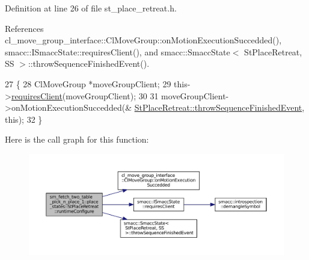 Definition at line 26 of file st\+\_\+place\+\_\+retreat.\+h.



References cl\+\_\+move\+\_\+group\+\_\+interface\+::\+Cl\+Move\+Group\+::on\+Motion\+Execution\+Succedded(), smacc\+::\+I\+Smacc\+State\+::requires\+Client(), and smacc\+::\+Smacc\+State$<$ St\+Place\+Retreat, S\+S $>$\+::throw\+Sequence\+Finished\+Event().


\begin{DoxyCode}
27     \{
28         ClMoveGroup *moveGroupClient;
29         this->\hyperlink{classsmacc_1_1ISmaccState_a7f95c9f0a6ea2d6f18d1aec0519de4ac}{requiresClient}(moveGroupClient);
30 
31         moveGroupClient->onMotionExecutionSuccedded(&
      \hyperlink{classsmacc_1_1SmaccState_a49dcfc25824f7e083dd4b999c49ab2b6}{StPlaceRetreat::throwSequenceFinishedEvent}, \textcolor{keyword}{this});
32     \}
\end{DoxyCode}
Here is the call graph for this function\+:
\nopagebreak
\begin{figure}[H]
\begin{center}
\leavevmode
\includegraphics[width=350pt]{structsm__fetch__two__table__pick__n__place__1_1_1place__states_1_1StPlaceRetreat_a4dcdef9108767df1d19da62b5e186a47_cgraph}
\end{center}
\end{figure}
\mbox{\label{structsm__fetch__two__table__pick__n__place__1_1_1place__states_1_1StPlaceRetreat_a8328c720fb586c684612935686c38e51}} 
